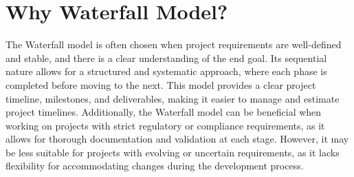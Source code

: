 \section{Why Waterfall Model?}
The Waterfall model is often chosen when project requirements are well-defined and stable, and there is a clear understanding of the end goal. Its sequential nature allows for a structured and systematic approach, where each phase is completed before moving to the next. This model provides a clear project timeline, milestones, and deliverables, making it easier to manage and estimate project timelines. Additionally, the Waterfall model can be beneficial when working on projects with strict regulatory or compliance requirements, as it allows for thorough documentation and validation at each stage. However, it may be less suitable for projects with evolving or uncertain requirements, as it lacks flexibility for accommodating changes during the development process.